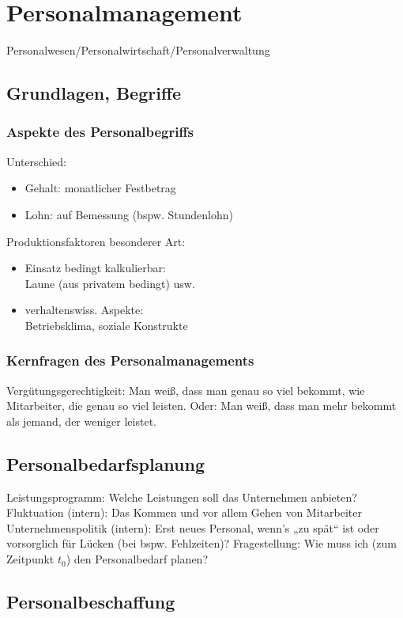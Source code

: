 \documentclass{scrreprt}
\begin{document}
\chapter{Personalmanagement}
Personalwesen/Personalwirtschaft/Personalverwaltung
\section{Grundlagen, Begriffe}
\subsection{Aspekte des Personalbegriffs}
Unterschied:
\begin{itemize}
\item Gehalt: monatlicher Festbetrag
\item Lohn: auf Bemessung (bspw. Stundenlohn)
\end{itemize}
Produktionsfaktoren besonderer Art:
\begin{itemize}
\item Einsatz bedingt kalkulierbar:\\
Laune (aus privatem bedingt) usw.
\item verhaltenswiss. Aspekte:\\
Betriebsklima, soziale Konstrukte
\end{itemize}
\subsection{Kernfragen des Personalmanagements}
Vergütungsgerechtigkeit: Man weiß, dass man genau so viel bekommt, wie Mitarbeiter, die genau so viel leisten. Oder: Man weiß, dass man mehr bekommt als jemand, der weniger leistet.

\section{Personalbedarfsplanung}
Leistungsprogramm: Welche Leistungen soll das Unternehmen anbieten?\\
Fluktuation (intern): Das Kommen und vor allem Gehen von Mitarbeiter\\
Unternehmenspolitik (intern): Erst neues Personal, wenn's „zu spät“ ist oder vorsorglich für Lücken (bei bspw. Fehlzeiten)?
Fragestellung: Wie muss ich (zum Zeitpunkt $t_0$) den Personalbedarf planen?

\section{Personalbeschaffung}
\end{document}
